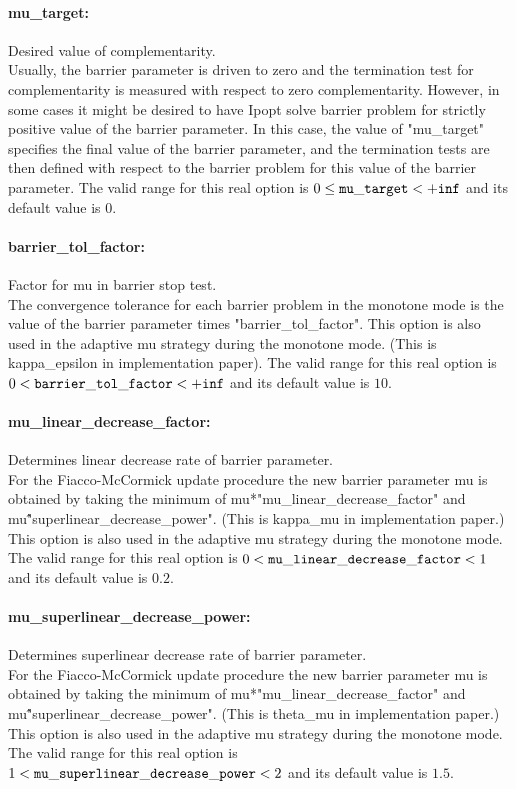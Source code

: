 \paragraph{mu\_target:}\label{opt:mu_target} Desired value of complementarity. \\
 Usually, the barrier parameter is driven to zero and the termination test for complementarity is measured with respect to zero complementarity.  However, in some cases it might be desired to have Ipopt solve barrier problem for strictly positive value of the barrier parameter.  In this case, the value of "mu\_target" specifies the final value of the barrier parameter, and the termination tests are then defined with respect to the barrier problem for this value of the barrier parameter. The valid range for this real option is 
$0 \le {\tt mu\_target } <  {\tt +inf}$
and its default value is $0$.


\paragraph{barrier\_tol\_factor:}\label{opt:barrier_tol_factor} Factor for mu in barrier stop test. \\
 The convergence tolerance for each barrier problem in the monotone mode is the value of the barrier parameter times "barrier\_tol\_factor". This option is also used in the adaptive mu strategy during the monotone mode. (This is kappa\_epsilon in implementation paper). The valid range for this real option is 
$0 <  {\tt barrier\_tol\_factor } <  {\tt +inf}$
and its default value is $10$.


\paragraph{mu\_linear\_decrease\_factor:}\label{opt:mu_linear_decrease_factor} Determines linear decrease rate of barrier parameter. \\
 For the Fiacco-McCormick update procedure the new barrier parameter mu is obtained by taking the minimum of mu*"mu\_linear\_decrease\_factor" and mu\^"superlinear\_decrease\_power".  (This is kappa\_mu in implementation paper.) This option is also used in the adaptive mu strategy during the monotone mode. The valid range for this real option is 
$0 <  {\tt mu\_linear\_decrease\_factor } <  1$
and its default value is $0.2$.


\paragraph{mu\_superlinear\_decrease\_power:}\label{opt:mu_superlinear_decrease_power} Determines superlinear decrease rate of barrier parameter. \\
 For the Fiacco-McCormick update procedure the new barrier parameter mu is obtained by taking the minimum of mu*"mu\_linear\_decrease\_factor" and mu\^"superlinear\_decrease\_power".  (This is theta\_mu in implementation paper.) This option is also used in the adaptive mu strategy during the monotone mode. The valid range for this real option is 
$1 <  {\tt mu\_superlinear\_decrease\_power } <  2$
and its default value is $1.5$.


